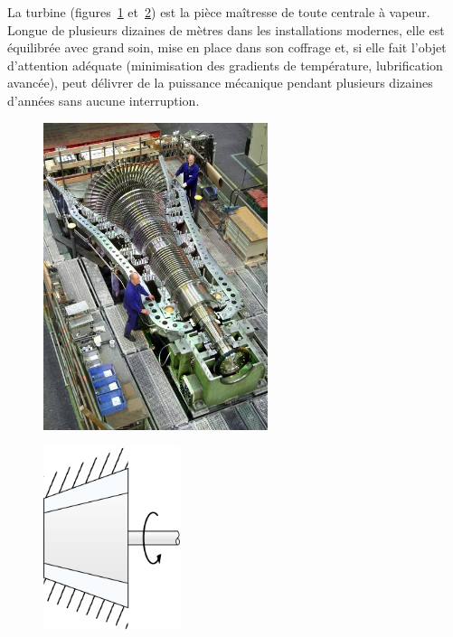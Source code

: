 		La turbine (figures~\ref{fig_centrale_turbine1} et~\ref{fig_centrale_turbine2}) est la pièce maîtresse de toute centrale à vapeur. Longue de plusieurs dizaines de mètres dans les installations modernes, elle est équilibrée avec grand soin, mise en place dans son coffrage et, si elle fait l’objet d’attention adéquate (minimisation des gradients de température, lubrification avancée), peut délivrer de la puissance mécanique pendant plusieurs dizaines d’années sans aucune interruption.

		\begin{figure}
			\begin{center}
				\includegraphics[height=9cm]{images/centrale_turbine_photo.jpg}
			\end{center}
			\label{fig_centrale_turbine1}
		\end{figure}

		\begin{figure}
			\begin{center}
				\includegraphics[width=4cm]{images/symbole_turbine.png}
			\end{center}
			\label{fig_centrale_turbine2}
		\end{figure}
		

